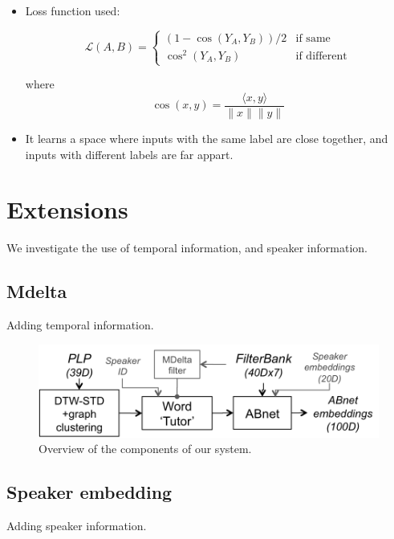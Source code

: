 \documentclass[final]{beamer}
\newcommand{\norm}[1]{\lVert#1\rVert}
\newcommand{\tup}[1]{\langle#1\rangle}
\begin{document}
\begin{frame}[t]
\begin{multicols}{3}
\begin{itemize}
\item Loss function used:

\[
\mathcal{L}(A, B) =
\begin{cases}
(1-\cos(Y_A, Y_B)) / 2 & \text{if same} \\
\cos^2(Y_A, Y_B)       & \text{if different}
\end{cases}
\]

\noindent        
where $$\cos(x, y) = \frac{\tup{x, y}}{\norm{x}\norm{y}}$$

\item It learns a space where inputs with the same label are close together, and inputs with different labels are far appart. 
\end{itemize}


\section*{Extensions}

We investigate the use of temporal information, and speaker information.

\subsection{Mdelta}

Adding temporal information.


\begin{figure}[ht!]
  \begin{center}
    \includegraphics[width=0.85\columnwidth]{System2.png}
    \caption{\label{fig:system}Overview of the components of our system.}
  \end{center}
\end{figure}

\subsection*{Speaker embedding}

Adding speaker information.



\end{multicols}
\end{frame}
\end{document}
